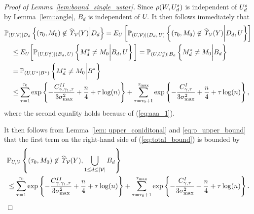 \documentclass[10pt,a4paper]{amsart}
\def\P{\mathbb P}
\begin{document}
\begin{proof}[Proof of Lemma~\ref{lem:bound_single_ustar}]
Since $\rho(\*W, \*U_d^s)$ is independent of $\*U_d^s$ by Lemma~\ref{lem::angle}, $B_d$ is independent of $\*U.$ It then follows immediately that 
\begin{align}
\label{eq:p_upper_bound}
    & \P_{(\*U,\mathcal V) | D_d}\left\{(\tau_0, \*M_0) \not\in \widehat{\it \Upsilon}_{{\mathcal V}}(\*Y) \middle| D_d\right\} =  E_{\*U}\left[\P_{(\*U,\mathcal V) | (D_d, \, \*U)}\left\{(\tau_0, \*M_0) \not\in \widehat{\it \Upsilon}_{{\mathcal V}}(\*Y) \bigg| D_d,  \*U\right\} \right]\nonumber\\
    & \quad \leq E_{\*U}\bigg[ \P_{(\*U,\*U_s^d) | (B_d, \, \*U)}\left\{ \*M^*_{d}  \neq \*M_0  \bigg| B_d,  \*U\right\} \bigg]  = \P_{(\*U,\*U_s^d) | B_d }\left\{ \*M^*_{d}  \neq \*M_0  \bigg| B_d\right\}\nonumber \\
   & \quad = \P_{(\*U,\*U^* | B^*)} \left\{ \*M_d^*  \neq \*M_0  \bigg| B^*\right\} \nonumber \\
   & \quad  \leq \sum_{\tau=1}^{\tau_0} \exp\left\{-\frac{C^{II}_{\gamma, \gamma_1, \tau}}{3\sigma^2_{\max}}  + \frac{n}4 + \tau\log(n)\right\} + \sum^{\tau_{\max}}_{\tau=\tau_0+1}
    \exp\left\{-\frac{C^I_{\gamma, \tau}}{3\sigma^2_{\max}} + \frac{n}4 +  \tau\log(n) \right\},
\end{align}
where the second equality holds because of (\ref{eq:aaa_1}).



 It then follows from Lemma~\ref{lem: upper_coniditonal} and \eqref{eq:p_upper_bound} that the first term  on the right-hand side of (\ref{eq:total_bound}) is bounded by  
\begin{align}
    & \P_{\*U,\mathcal V  }\left\{(\tau_0, \*M_0) \not\in \widehat{\it \Upsilon}_{{\mathcal V}}(\*Y), \bigcup_{ 1 \leq d \leq |\mathcal V|}
    B_d \right\}  \nonumber\\
     &\leq \sum_{\tau=1}^{\tau_0} \exp\left\{-\frac{C^{II}_{\gamma, \gamma_1, \tau}}{3\sigma^2_{\max}}  + \frac{n}4 + \tau\log(n)\right\} + \sum^{\tau_{\max}}_{\tau=\tau_0+1}
    \exp\left\{-\frac{C^I_{\gamma, \tau}}{3\sigma^2_{\max}} + \frac{n}4 +  \tau\log(n) \right\}.
\label{eq:inequality_single}
\end{align}



\end{proof}
\end{document}
